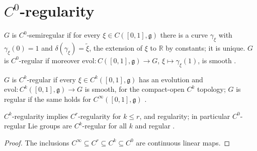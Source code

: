 \section{$C^0$-regularity}

\begin{definition}
  \label{def:c0-regular}
  \leanok
  $G$ is $C^0$-semiregular if for every $\xi \in C([0, 1], \mathfrak g)$ there is a curve
  $\gamma_\xi$ with $\gamma_\xi(0) = 1$ and $\delta(\gamma_\xi) = \tilde\xi$, the extension of $\xi$
  to $\mathbb{R}$ by constants; it is unique. $G$ is $C^0$-regular if moreover
  $\mathrm{evol}\colon C([0, 1], \mathfrak g) \to G$, $\xi \mapsto \gamma_\xi(1)$, is smooth
  \cite[Definition 6.1.1]{GN26}.
\end{definition}

\begin{definition}
  \label{def:ck-regular}
  \leanok
  $G$ is $C^k$-regular if every $\xi \in C^k([0, 1], \mathfrak g)$ has an evolution and
  $\mathrm{evol}\colon C^k([0, 1], \mathfrak g) \to G$ is smooth, for the compact-open $C^k$
  topology; $G$ is regular if the same holds for $C^\infty([0, 1], \mathfrak g)$
  \cite[Definition 6.1.1]{GN26}.
\end{definition}

\begin{proposition}
  \label{prop:ck-regular-mono}
  \leanok
  $C^k$-regularity implies $C^r$-regularity for $k \leq r$, and regularity; in particular
  $C^0$-regular Lie groups are $C^k$-regular for all $k$ and regular
  \cite[Remark 6.1.2(c)]{GN26}.
\end{proposition}

\begin{proof}
  \leanok
  The inclusions $C^\infty \subseteq C^r \subseteq C^k \subseteq C^0$ are continuous linear maps.
\end{proof}

